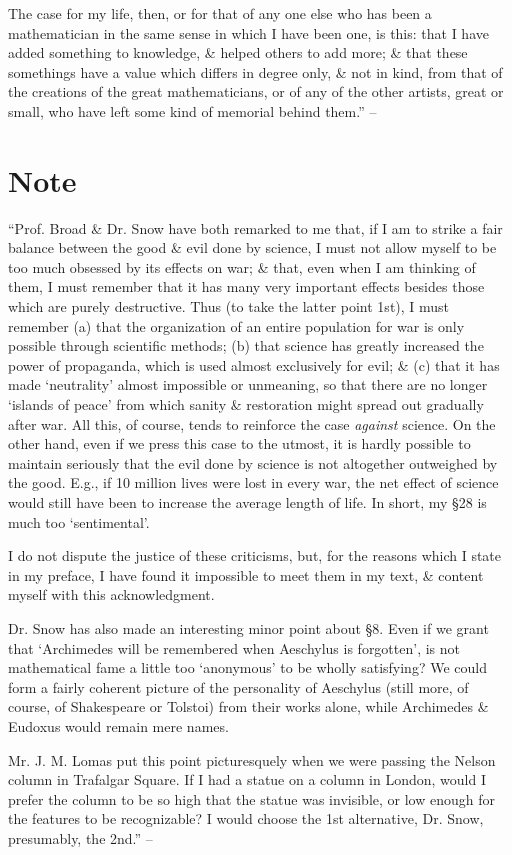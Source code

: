\documentclass{article}
\numberwithin{equation}{section}
\begin{document}
The case for my life, then, or for that of any one else who has been a mathematician in the same sense in which I have been one, is this: that I have added something to knowledge, \& helped others to add more; \& that these somethings have a value which differs in degree only, \& not in kind, from that of the creations of the great mathematicians, or of any of the other artists, great or small, who have left some kind of memorial behind them.'' -- \cite[pp. 144--151]{Hardy1992}


\section{Note}
``Prof. Broad \& Dr. Snow have both remarked to me that, if I am to strike a fair balance between the good \& evil done by science, I must not allow myself to be too much obsessed by its effects on war; \& that, even when I am thinking of them, I must remember that it has many very important effects besides those which are purely destructive. Thus (to take the latter point 1st), I must remember (a) that the organization of an entire population for war is only possible through scientific methods; (b) that science has greatly increased the power of propaganda, which is used almost exclusively for evil; \& (c) that it has made `neutrality' almost impossible or unmeaning, so that there are no longer `islands of peace' from which sanity \& restoration might spread out gradually after war. All this, of course, tends to reinforce the case \textit{against} science. On the other hand, even if we press this case to the utmost, it is hardly possible to maintain seriously that the evil done by science is not altogether outweighed by the good. E.g., if 10 million lives were lost in every war, the net effect of science would still have been to increase the average length of life. In short, my \S28 is much too `sentimental'.

I do not dispute the justice of these criticisms, but, for the reasons which I state in my preface, I have found it impossible to meet them in my text, \& content myself with this acknowledgment.

Dr. Snow has also made an interesting minor point about \S8. Even if we grant that `Archimedes will be remembered when Aeschylus is forgotten', is not mathematical fame a little too `anonymous' to be wholly satisfying? We could form a fairly coherent picture of the personality of Aeschylus (still more, of course, of Shakespeare or Tolstoi) from their works alone, while Archimedes \& Eudoxus would remain mere names.

Mr. J. M. Lomas put this point picturesquely when we were passing the Nelson column in Trafalgar Square. If I had a statue on a column in London, would I prefer the column to be so high that the statue was invisible, or low enough for the features to be recognizable? I would choose the 1st alternative, Dr. Snow, presumably, the 2nd.'' -- \cite[pp. 152--153]{Hardy1992}


\printbibliography[heading=bibintoc]
	
\end{document}

